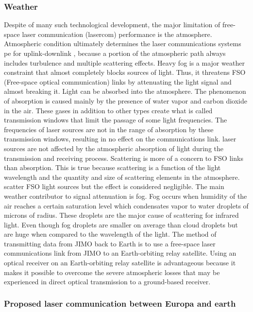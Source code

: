 \subsubsection{Weather}

Despite of many such technological development, the major limitation of free-space laser communication (lasercom) performance is the atmosphere.  Atmospheric condition ultimately determines the laser communications systems pe for uplink-downlink , because a portion of the atmospheric path always includes turbulence and multiple scattering effects.
Heavy fog is a major weather constraint that almost completely blocks sources of light. Thus, it threatens FSO (Free-space optical communication) links by attenuating the light signal and almost breaking it.
 Light can be absorbed into the atmosphere. The phenomenon of absorption is caused mainly by the presence of water vapor and carbon dioxide in the air. These gases in addition to other types create what is called transmission windows that limit the passage of some light frequencies. The frequencies of laser sources are not in the range of absorption by these transmission windows, resulting in no effect on the communications link. laser sources are not affected by the atmospheric absorption of light during the transmission and receiving process.
Scattering is more of a concern to FSO links than absorption. This is true because scattering is a function of the light wavelength and the quantity and size of scattering elements in the atmosphere. scatter FSO light sources but the effect is considered negligible. The main weather contributor to signal attenuation is fog. Fog occurs when humidity of the air reaches a certain saturation level which condensates vapor to water droplets of microns of radius. These droplets are the major cause of scattering for infrared light. Even though fog droplets are smaller on average than cloud droplets but are huge when compared to the wavelength of the light.
The method of transmitting data from JIMO back to Earth is to use a free-space laser communications link from JIMO to an Earth-orbiting relay satellite. Using an optical receiver on an Earth-orbiting relay satellite is advantageous because it makes it possible to overcome the severe  atmospheric losses that may be experienced in direct optical transmission to a ground-based receiver.

\subsubsection{Proposed laser communication between Europa and earth}

